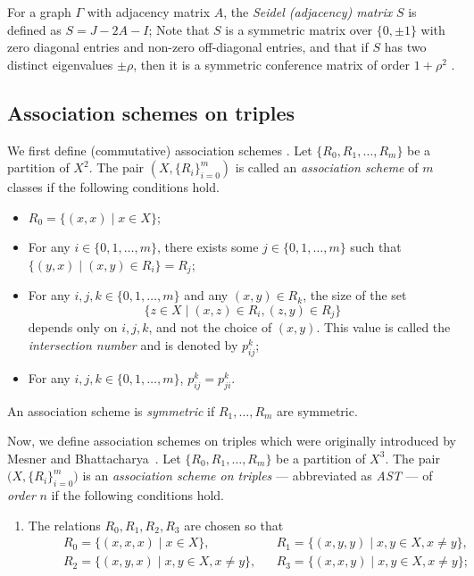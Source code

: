 \documentclass[11pt,oneside]{amsart}
\newcommand{\defn}[1]{\textit{#1}}
\begin{document}
{ For a graph $\Gamma$ with adjacency matrix $A$, the \defn{Seidel (adjacency) matrix} $S$ is defined as $S=J-2A-I$;
Note that $S$ is a symmetric matrix over $\{0,\pm 1\}$ with zero diagonal entries and non-zero off-diagonal entries, and that if $S$ has two distinct eigenvalues $\pm\rho$, then it is a symmetric conference matrix of order $1+\rho^2$ \cite{MR2882891}.  

\subsection{Association schemes on triples} 


We first define (commutative) association schemes \cite{BannaiIto1984}. 
Let $\{R_0,R_1,\ldots,R_m\}$ be a partition of $X^2$.
The pair $(X,\{R_i\}_{i=0}^m)$ is called
an {\em association scheme} of $m$ classes if the following conditions hold.
\begin{itemize}
\item $R_0 =\{(x,x) \mid x\in X\}$;
\item For any $i\in\{0,1,\ldots,m\}$, there exists some $j\in\{0,1,\ldots,m\}$ such that $\{(y,x) \mid (x,y)\in R_i\}=R_{j}$;
\item For any $i,j,k\in\{0,1,\ldots,m\}$ and any $(x,y)\in R_k$, the size of the set 
    \[
    \{z\in X \mid (x,z)\in R_i,(z,y)\in R_j\}
    \]
    depends only on $i,j,k$, and not  the choice of $(x,y)$.  
    This value is called the \defn{intersection number} and is denoted by $p_{ij}^{k}$;  
\item For any $i,j,k\in\{0,1,\ldots,m\}$, $p_{ij}^{k}=p_{ji}^k$. 
\end{itemize}
An association scheme is {\it symmetric} if  $R_1,\dots,R_m$ are symmetric. 

Now, we define association schemes on triples which were   originally
introduced by Mesner and Bhattacharya~\cite{MR1075708, MR1272106}.
Let $\{R_0,R_1,\ldots,R_m\}$ be
a partition of $X^3$. The pair
$\big(X,\{R_i\}_{i=0}^m\big)$ is an \emph{association scheme on triples} --- abbreviated as \emph{AST} --- of \emph{order} $n$ if the following  conditions hold.
\begin{enumerate}[label=(\Roman*)]
    \item\label{ast1} The relations $R_0,R_1,R_2,R_3$ are chosen so that
 \begin{align*}
    &&
    &R_0=\{(x,x,x)\mid x\in X\},
    &&
    R_1=\{(x,y,y)\mid x,y\in X,x\neq y\},\\
    &&&
    R_2=\{(x,y,x)\mid x,y\in X,x\neq y\},
    &&
    R_3=\{(x,x,y)\mid x,y\in X,x\neq y\};
    &&
  \end{align*}


\end{enumerate}}
\end{document}
